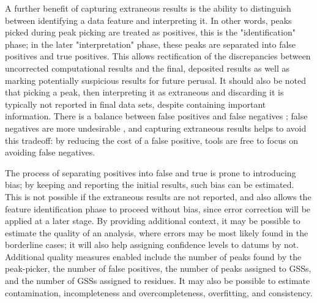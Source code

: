 A further benefit of capturing extraneous results is the ability to distinguish
between identifying a data feature and interpreting it.  In other words, peaks
picked during peak picking are treated as positives, this is the "identification"
phase; in the later "interpretation" phase, these peaks are separated into
false positives and true positives.  This allows rectification of the 
discrepancies between uncorrected computational results and the final,
deposited results as well as marking potentially suspicious results for 
future perusal.  It should also be noted that picking a peak, then
interpreting it as extraneous and discarding it is typically not reported in
final data sets, despite containing important information.
There is a balance between false positives and false negatives \cite{pine};
false negatives are more undesirable \cite{pine, saga, guntert2009automated},
and capturing extraneous results helps to avoid this tradeoff: by reducing
the cost of a false positive, tools are free to focus on avoiding false
negatives.

The process of separating positives into false and true is prone to 
introducing bias; by keeping and reporting the initial results, such bias
can be estimated.  This is not possible if the extraneous results are not
reported, and also allows the feature identification phase to proceed
without bias, since error correction will be applied at a later stage. 
By providing additional context, it may be possible to estimate the quality 
of an analysis, where errors may be most likely found in the borderline 
cases; it will also help assigning confidence levels to datums by not.
Additional quality measures enabled include the number of peaks found by the
peak-picker, the number of false positives, the number of peaks assigned to
GSSs, and the number of GSSs assigned to residues.  It may also be possible
to estimate contamination, incompleteness and overcompleteness, overfitting, 
and consistency.

